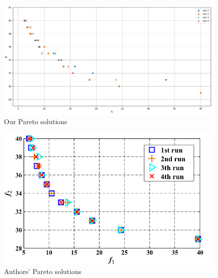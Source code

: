 \begin{figure}
    \includegraphics[width=\linewidth]{Images/our_results_4_runs.png}
    \caption{Our Pareto solutions}
    \label{fig:pareto_results}
\end{figure}

\begin{figure}
    \includegraphics[width=\linewidth]{Images/authors_results.png}
    \caption{Authors' Pareto solutions}
    \label{fig:authors_results}
\end{figure}
